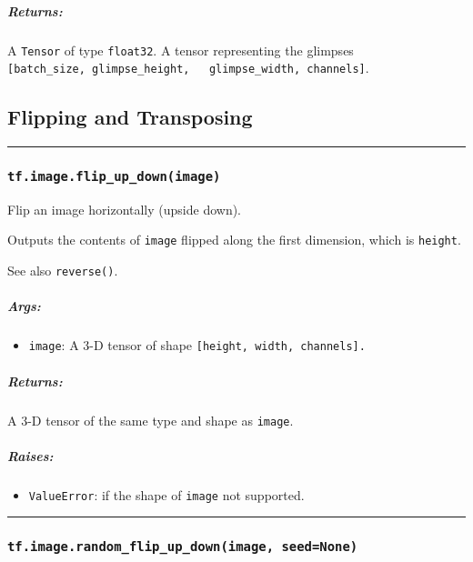 \subparagraph{Returns: }\label{returns-13}

A \texttt{Tensor} of type \texttt{float32}. A tensor representing the
glimpses
\texttt{{[}batch\_size,\ glimpse\_height,\ \ \ glimpse\_width,\ channels{]}}.

\subsection{Flipping and Transposing }\label{flipping-and-transposing}

\begin{center}\rule{0.5\linewidth}{\linethickness}\end{center}

\subsubsection{\texorpdfstring{\texttt{tf.image.flip\_up\_down(image)}
}{tf.image.flip\_up\_down(image) }}\label{tf.image.flipux5fupux5fdownimage}

Flip an image horizontally (upside down).

Outputs the contents of \texttt{image} flipped along the first
dimension, which is \texttt{height}.

See also \texttt{reverse()}.

\subparagraph{Args: }\label{args-14}

\begin{itemize}
\tightlist
\item
  \texttt{image}: A 3-D tensor of shape
  \texttt{{[}height,\ width,\ channels{]}.}
\end{itemize}

\subparagraph{Returns: }\label{returns-14}

A 3-D tensor of the same type and shape as \texttt{image}.

\subparagraph{Raises: }\label{raises-4}

\begin{itemize}
\tightlist
\item
  \texttt{ValueError}: if the shape of \texttt{image} not supported.
\end{itemize}

\begin{center}\rule{0.5\linewidth}{\linethickness}\end{center}

\subsubsection{\texorpdfstring{\texttt{tf.image.random\_flip\_up\_down(image,\ seed=None)}
}{tf.image.random\_flip\_up\_down(image, seed=None) }}\label{tf.image.randomux5fflipux5fupux5fdownimage-seednone}

